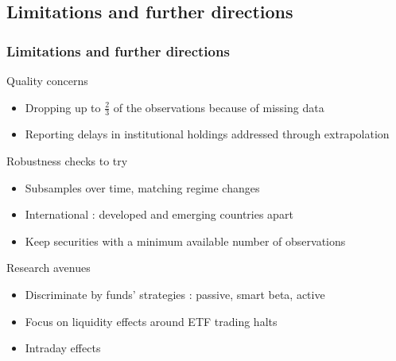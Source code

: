 \documentclass[handout, 9pt, usenames, dvipsnames]{beamer}
\begin{document}
\subsection{Limitations and further directions}
\begin{frame}
  \frametitle{Limitations and further directions}
  \begin{block}{Quality concerns}
    \begin{itemize}
    \item Dropping up to $\frac{2}{3}$ of the observations because of missing data
      \item Reporting delays in institutional holdings addressed through extrapolation
      \end{itemize}
  \end{block}
  \begin{block}{Robustness checks to try}
  \begin{itemize}
    \item Subsamples over time, matching regime changes
    \item International : developed and emerging countries apart
      \item Keep securities with a minimum available number of observations
  \end{itemize}
\end{block}
\begin{block}{Research avenues}
  \begin{itemize}
    \item Discriminate by funds' strategies : passive, smart beta, active
  \item Focus on liquidity effects around ETF trading halts
    \item Intraday effects
  \end{itemize}
  \end{block}
\end{frame}
\end{document}
